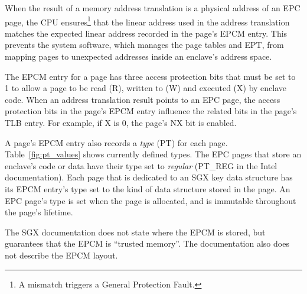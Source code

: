 When the result of a memory address translation is a physical address of an EPC
page, the CPU ensures\footnote{A mismatch triggers a General Protection Fault.}
that the linear address used in the address translation matches the expected
linear address recorded in the page's EPCM entry. This prevents the system
software, which manages the page tables and EPT, from mapping pages to
unexpected addresses inside an enclave's address space.

The EPCM entry for a page has three access protection bits that must be set to
1 to allow a page to be read (R), written to (W) and executed (X) by enclave
code. When an address translation result points to an EPC page, the access
protection bits in the page's EPCM entry influence the related bits in the
page's TLB entry. For example, if X is 0, the page's NX bit is enabled.

A page's EPCM entry also records a \textit{type} (PT) for each page.
Table~\ref{fig:pt_values} shows currently defined types. The EPC pages that
store an enclave's code or data have their type set to \textit{regular}
(PT\_REG in the Intel documentation). Each page that is dedicated to an SGX key
data structure has its EPCM entry's type set to the kind of data structure
stored in the page.  An EPC page's type is set when the page is allocated, and
is immutable throughout the page's lifetime.

\begin{table}[hbt]
  \caption{Values of the PT (page type) field in an EPCM entry.}
  \label{fig:pt_values}
\end{table}


The SGX documentation does not state where the EPCM is stored, but guarantees
that the EPCM is ``trusted memory''. The documentation also does not describe
the EPCM layout.



